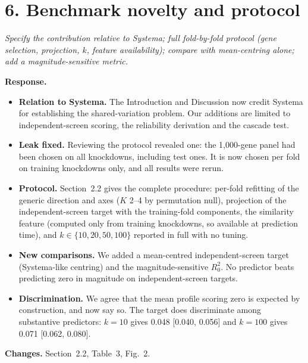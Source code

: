 \documentclass[10pt]{article}
\newenvironment{rev}{\par\medskip\noindent\color{black!70}\itshape}{\par}
\newcommand{\resp}{\par\smallskip\noindent\textbf{Response.} }
\newcommand{\chg}{\par\smallskip\noindent\textbf{Changes.} }
\begin{document}
\section*{6. Benchmark novelty and protocol}
\begin{rev}Specify the contribution relative to Systema; full fold-by-fold protocol (gene selection, projection, $k$, feature availability); compare with mean-centring alone; add a magnitude-sensitive metric.\end{rev}
\resp
\begin{itemize}
\item \textbf{Relation to Systema.} The Introduction and Discussion now credit Systema for establishing the shared-variation problem. Our additions are limited to independent-screen scoring, the reliability derivation and the cascade test.
\item \textbf{Leak fixed.} Reviewing the protocol revealed one: the 1{,}000-gene panel had been chosen on all knockdowns, including test ones. It is now chosen per fold on training knockdowns only, and all results were rerun.
\item \textbf{Protocol.} Section~2.2 gives the complete procedure: per-fold refitting of the generic direction and axes ($K$ 2--4 by permutation null), projection of the independent-screen target with the training-fold components, the similarity feature (computed only from training knockdowns, so available at prediction time), and $k\in\{10,20,50,100\}$ reported in full with no tuning.
\item \textbf{New comparisons.} We added a mean-centred independent-screen target (Systema-like centring) and the magnitude-sensitive $R^2_0$. No predictor beats predicting zero in magnitude on independent-screen targets.
\item \textbf{Discrimination.} We agree that the mean profile scoring zero is expected by construction, and now say so. The target does discriminate among substantive predictors: $k=10$ gives 0.048 [0.040, 0.056] and $k=100$ gives 0.071 [0.062, 0.080].
\end{itemize}
\chg Section~2.2, Table~3, Fig.~2.
\end{document}
